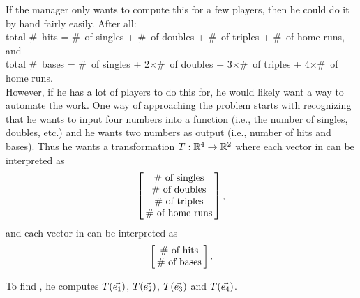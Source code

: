 {If the manager only wants to compute this for a few players, then he could do it by hand fairly easily. After all: \\


\noindent total \#\ hits = \#\ of singles + \#\ of doubles + \#\ of triples + \#\ of home runs,\\

and \\

\noindent total \#\ bases = \#\ of singles + 2$\times$\#\ of doubles + 3$\times$\#\ of triples + 4$\times$\#\ of home runs.\\

However, if he has a lot of players to do this for, he would likely want a way to automate the work.  One way of approaching the problem starts with recognizing that he wants to input four numbers into a function (i.e., the number of singles, doubles, etc.) and he wants two numbers as output (i.e., number of hits and bases). Thus he wants a transformation $T:\rrr{4}{2}$ where each vector in  can be interpreted as $$\bmx{c} \text{\#\ of singles} \\\text{\#\ of doubles} \\ \text{\#\ of triples} \\ \text{\#\ of home runs} \emx,$$ and each vector in  can be interpreted as $$\bmx{c} \text{\#\ of hits} \\\text{\#\ of bases} \emx.$$


To find \TT, he computes $T(\veone)$, $T(\vetwo)$, $T(\vethree)$ and $T(\ven{4})$.\\

}
